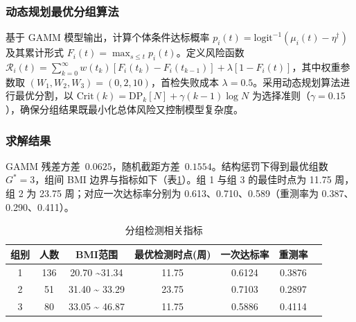 \subsubsection{动态规划最优分组算法}

基于 GAMM 模型输出，计算个体条件达标概率 \( p_i(t) = \text{logit}^{-1}(\mu_i(t) - \eta^{\dagger}) \) 及其累计形式 \( F_i(t) = \max_{s \leq t} p_i(t) \)。定义风险函数 \( \mathcal{R}_i(t) = \sum_{k=0}^{\infty} w(t_k) \left[ F_i(t_k) - F_i(t_{k-1}) \right] + \lambda \left[ 1 - F_i(t) \right] \)，其中权重参数取 \( (W_1, W_2, W_3) = (0, 2, 10) \)，首检失败成本 \( \lambda = 0.5 \)。采用动态规划算法进行最优分割，以 \( \text{Crit}(k) = \text{DP}_k[N] + \gamma (k - 1) \log N \) 为选择准则（\( \gamma = 0.15 \)），确保分组结果既最小化总体风险又控制模型复杂度。

\subsubsection{求解结果}  

GAMM 残差方差 \(0.0625\)，随机截距方差 \(0.1554\)。结构惩罚下得到最优组数 \(G^{*} = 3\)，组间 BMI 边界与指标如下（表\ref{tab:divide}）。组 1 与组 3 的最佳时点为 11.75 周，组 2 为 23.75 周；对应一次达标率分别为 0.613、0.710、0.589（重测率为 0.387、0.290、0.411）。

\begin{table}[htbp]
  \centering
  \caption{分组检测相关指标}
  \label{tab:divide}
  \begin{tabular}{ccccccc}
    \toprule
    组别 & 人数 & BMI范围 & 最优检测时点(周) & 一次达标率 & 重测率  \\
    \midrule
    1 & 136 & 20.70 \~{}31.34& 11.75 & 0.6124 & 0.3876  \\
    2 & 51 & 31.40 \~{} 33.29 & 23.75 & 0.7103 & 0.2897  \\
    3 & 80 & 33.05 \~{} 46.87 & 11.75 & 0.5886 & 0.4114  \\
    \bottomrule
  \end{tabular}
\end{table}

